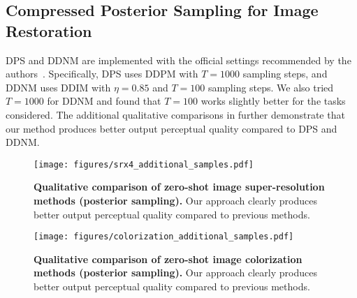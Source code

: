 \subsection{Compressed Posterior Sampling for Image Restoration}\label{appendix:zero-shot}
DPS and DDNM are implemented with the official settings recommended by the authors~\citep{chung2023diffusion,wang2023zeroshot}.
Specifically, DPS uses DDPM with $T=1000$ sampling steps, and DDNM uses DDIM with $\eta=0.85$ and $T=100$ sampling steps.
We also tried $T=1000$ for DDNM and found that $T=100$ works slightly better for the tasks considered.
The additional qualitative comparisons in  further demonstrate that our method produces better output perceptual quality compared to DPS and DDNM.
\begin{figure*}[t]
    \centering
    \texttt{[image: figures/srx4\_additional\_samples.pdf]}
    \caption{\textbf{Qualitative comparison of zero-shot image super-resolution methods (posterior sampling).} Our approach clearly produces better output perceptual quality compared to previous methods.}
    \label{fig:srx4_additional_samples}
\end{figure*}
\begin{figure*}[t]
    \centering
    \texttt{[image: figures/colorization\_additional\_samples.pdf]}
    \caption{\textbf{Qualitative comparison of zero-shot image colorization methods (posterior sampling).} Our approach clearly produces better output perceptual quality compared to previous methods.}
    \label{fig:colorization_additional_samples}
\end{figure*}